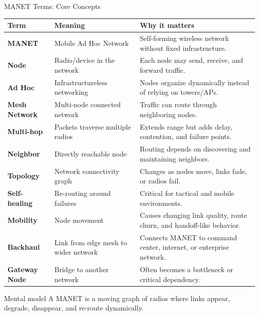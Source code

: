 \documentclass[aspectratio=169]{beamer}
\begin{document}
\begin{frame}{MANET Terms: Core Concepts}
\tiny
\begin{tabular}{p{2.0cm} p{3.4cm} p{6.7cm}}
\toprule
\textbf{Term} & \textbf{Meaning} & \textbf{Why it matters} \\
\midrule
\textbf{MANET} & Mobile Ad Hoc Network & Self-forming wireless network without fixed infrastructure. \\
\textbf{Node} & Radio/device in the network & Each node may send, receive, and forward traffic. \\
\textbf{Ad Hoc} & Infrastructureless networking & Nodes organize dynamically instead of relying on towers/APs. \\
\textbf{Mesh Network} & Multi-node connected network & Traffic can route through neighboring nodes. \\
\textbf{Multi-hop} & Packets traverse multiple radios & Extends range but adds delay, contention, and failure points. \\
\textbf{Neighbor} & Directly reachable node & Routing depends on discovering and maintaining neighbors. \\
\textbf{Topology} & Network connectivity graph & Changes as nodes move, links fade, or radios fail. \\
\textbf{Self-healing} & Re-routing around failures & Critical for tactical and mobile environments. \\
\textbf{Mobility} & Node movement & Causes changing link quality, route churn, and handoff-like behavior. \\
\textbf{Backhaul} & Link from edge mesh to wider network & Connects MANET to command center, internet, or enterprise network. \\
\textbf{Gateway Node} & Bridge to another network & Often becomes a bottleneck or critical dependency. \\
\bottomrule
\end{tabular}

\vspace{0.15cm}
\begin{block}{Mental model}
A MANET is a moving graph of radios where links appear, degrade, disappear, and re-route dynamically.
\end{block}
\end{frame}
\end{document}
